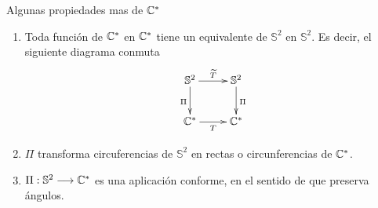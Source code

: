 Algunas propiedades mas de $\mathbb{C}^*$
\begin{enumerate}
    \item Toda función de $\mathbb{C}^*$ en $\mathbb{C}^*$ tiene un equivalente de $\mathbb{S}^2$ en $\mathbb{S}^2$. Es decir, el siguiente diagrama conmuta
          \begin{align*}
              \xymatrix{
              \mathbb{S}^2 \ar[d]_{\Pi} \ar[r]^{\widetilde{T}} & \mathbb{S}^2 \ar[d]^{\Pi} \\
              \com^* \ar[r]_{T}                                & \com^*
              }
          \end{align*}
    \item $\Pi$ transforma circuferencias de $\mathbb{S}^2$ en rectas o circunferencias de $\mathbb{C}^*$.
    \item $\Pi : \mathbb{S}^2 \longrightarrow \mathbb{C}^*$ es una aplicación conforme, en el sentido de que preserva ángulos.
\end{enumerate}